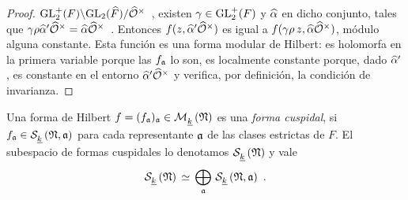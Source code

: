 \begin{proof}
\begin{math}
		\GLtp_{2}(F)\backslash\GL_{2}(\Adfin{F})/\Idfin{\cal{O}}
	\end{math}~,
	existen $\gamma\in\GLtp_{2}(F)$ y $\hhat{\alpha}$ en dicho conjunto,
	tales que
	\begin{math}
		\gamma\rho\hhat{\alpha}'\Idfin{\cal{O}}=
			\hhat{\alpha}\Idfin{\cal{O}}
	\end{math}~.
	Entonces $f(z,\hhat{\alpha}'\Idfin{\cal{O}})$ es igual a
	$f(\gamma\rho\,z,\hhat{\alpha}\Idfin{\cal{O}})$, m\'{o}dulo alguna
	constante. Esta funci\'{o}n es una forma modular de Hilbert: es
	holomorfa en la primera variable porque las $f_{\frak{a}}$ lo son,
	es localmente constante porque, dado $\hhat{\alpha}'$, es constante en
	el entorno $\hhat{\alpha}'\Idfin{\cal{O}}$ y verifica, por
	definici\'{o}n, la condici\'{o}n de invarianza.
\end{proof}

\begin{defFormaDeHilbertCuspidalDeNivelN}%
	\label{def:formadehilbertcuspidaldeniveln}
	Una forma de Hilbert $f=(f_{\frak{a}})_{\frak{a}}\in%
	\modularH{k}{\frak{N}}$ es una \emph{forma cuspidal}, si
	$f_{\frak{a}}\in\spitzH{k}{\frak{N},\frak{a}}$ para cada
	representante $\frak{a}$ de las clases estrictas de $F$.
	El subespacio de formas cuspidales lo denotamos
	$\spitzH{k}{\frak{N}}$ y vale
	\begin{equation}
		\label{eq:descomposicioncuspidalesmatrices}
		\spitzH{k}{\frak{N}} \,\simeq\, \bigoplus_{\frak{a}}\,
			\spitzH{k}{\frak{N},\frak{a}}
		\text{ .}
	\end{equation}
\end{defFormaDeHilbertCuspidalDeNivelN}

